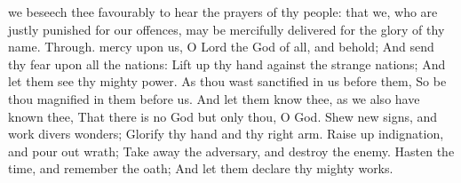 \collect
{} we beseech thee favourably to hear the prayers of thy people: that we, who are justly punished for our offences, may be mercifully delivered for the glory of thy name. Through.
 mercy upon us, O Lord the God of all, and behold; And send thy fear upon all the nations: Lift up thy hand against the strange nations; And let them see thy mighty power. As thou wast sanctified in us before them, So be thou magnified in them before us. And let them know thee, as we also have known thee, That there is no God but only thou, O God. Shew new signs, and work divers wonders; Glorify thy hand and thy right arm. Raise up indignation, and pour out wrath; Take away the adversary, and destroy the enemy. Hasten the time, and remember the oath; And let them declare thy mighty works.

